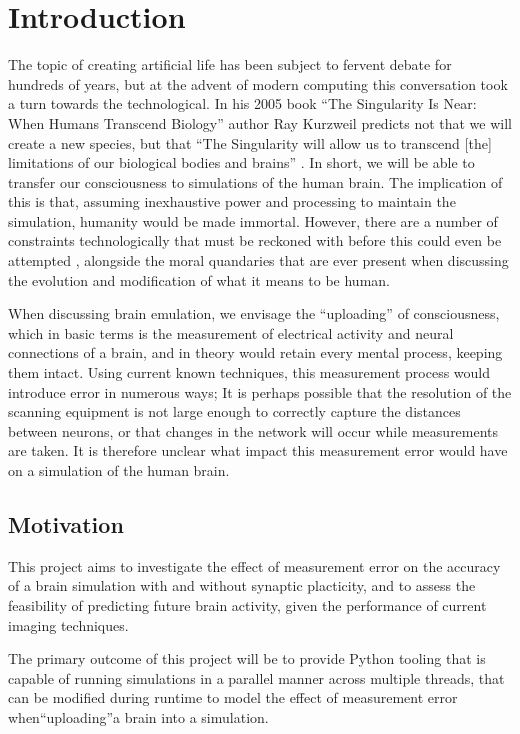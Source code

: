 \chapter{Introduction}

The topic of creating artificial life has been subject to fervent debate for
hundreds of years, but at the advent of modern computing this conversation took
a turn towards the technological. In his 2005 book “The Singularity Is Near:
When Humans Transcend Biology” author Ray Kurzweil predicts not that we will
create a new species, but that “The Singularity will allow us to transcend [the]
limitations of our biological bodies and brains”
\parencite{kurzweil_singularity_2006}.
In short, we will be able to transfer our
consciousness to simulations of the human brain. The implication of this is
that, assuming inexhaustive power and processing to maintain the simulation,
humanity would be made immortal. However, there are a number of constraints
technologically that must be reckoned with before this could even be attempted
\parencite{bostrom_whole_2008}, alongside the moral quandaries that are ever
present when discussing the evolution and modification of what it means to be
human. 

When discussing brain emulation, we envisage the “uploading” of
consciousness, which in basic terms is the measurement of electrical activity
and neural connections of a brain, and in theory would retain every mental
process, keeping them intact. Using current known techniques, this
measurement process would introduce error in numerous ways; It is perhaps
possible that the resolution of the scanning equipment is not large enough to
correctly capture the distances between neurons, or that changes in the network
will occur while measurements are taken. It is therefore unclear what impact
this measurement error would have on a simulation of the human brain.

\section{Motivation}

This project aims to investigate the effect of measurement error on the accuracy
of a brain simulation with and without synaptic placticity, and to assess the
feasibility of predicting future brain activity, given the performance of
current imaging techniques.

The primary outcome of this project will be to provide Python tooling that is
capable of running simulations in a parallel manner across multiple threads,
that can be modified during runtime to model the effect of measurement error
when“uploading”a brain into a simulation. 

